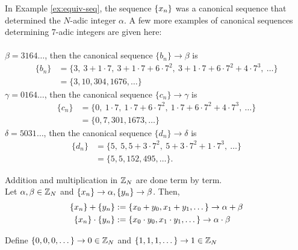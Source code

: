 \begin{example} \label{ex:canon}
  In Example \ref{ex:equiv-seq}, the sequence $\{x_n\}$ was a canonical
  sequence that determined the $N$-adic integer $\alpha$. A few more examples
  of canonical sequences determining 7-adic integers are given here:\\
  \\
 $\beta = 3164\dots$, then the canonical sequence $\{b_n\} \rightarrow \beta$ is
  \begin{align*}
    \{b_n\} &= \{3, \ 3+1\cdot7, \ 3+1\cdot7+6\cdot7^2, \ 3+1\cdot7+6\cdot7^2+4\cdot7^3, \ \dots\}\\
            &= \{3,10,304,1676,\dots\}
  \end{align*}
  $\gamma = 0164\dots$, then the canonical sequence $\{c_n\} \rightarrow \gamma$ is
  \begin{align*}
    \{c_n\} &= \{0, \ 1\cdot7, \ 1\cdot7+6\cdot7^2, \ 1\cdot7+6\cdot7^2+4\cdot7^3, \ \dots\}\\
            &= \{0,7,301,1673,\dots\}
  \end{align*}
  $\delta = 5031\dots$, then the canonical sequence $\{d_n\} \rightarrow \delta$ is
  \begin{align*}
    \{d_n\} &= \{5, \ 5, 5+3\cdot7^2, \ 5+3\cdot7^2+1\cdot7^3, \ \dots\}\\
            &= \{5,5,152,495,\dots\}.
  \end{align*}
\end{example}

\begin{definition}
  Addition and multiplication in $\mathbb{Z}_N$ are done term by term. \\
  Let $\alpha,\beta \in \mathbb{Z}_N$ and $\{x_n\} \rightarrow \alpha, \{y_n\} \rightarrow \beta$. Then,
  \begin{align*}
    \{x_n\}+\{y_n\}     &:= \{x_0+y_0, x_1+y_1, \dots\} \rightarrow \alpha+\beta\\
    \{x_n\}\cdot\{y_n\} &:= \{x_0 \cdot y_0, x_1 \cdot y_1, \dots\} \rightarrow \alpha \cdot \beta\\ 
  \end{align*}

  Define $\{0,0,0,\dots\} \rightarrow 0 \in \mathbb{Z}_N$ and $\{1,1,1,\dots\} \rightarrow 1 \in \mathbb{Z}_N$
\end{definition}

